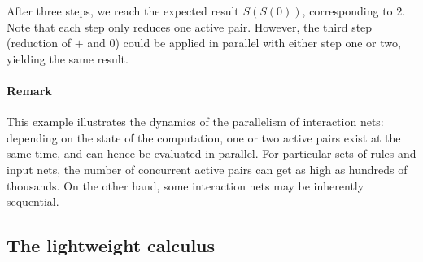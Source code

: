 \documentclass[submission,copyright,creativecommons]{eptcs}
\begin{document}
\begin{exp:addition_reduction}

After three steps, we reach the expected result $S(S(0))$, corresponding to $2$.
Note that each step only reduces one active pair. However, the third step
(reduction of $+$ and $0$) could be applied in parallel with either step one or
two, yielding the same result.
\end{exp:addition_reduction}

\paragraph{\textbf{Remark}}
This example illustrates the dynamics of the parallelism of interaction nets:
depending on the state of the computation, one or two active pairs
exist at the same time, and can hence be evaluated in parallel. For particular
sets of rules and input nets, the number of concurrent active pairs can get
as high as hundreds of thousands. On the other hand, some interaction nets may be inherently sequential.

\subsection{The lightweight calculus}
\label{sec:lightweight_calculus}
\end{document}
